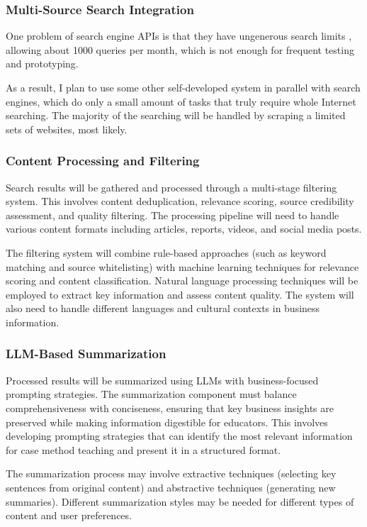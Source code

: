 \documentclass[project-plan]{report-template}
\begin{document}
\subsubsection{Multi-Source Search Integration} 
One problem of search engine APIs is that they have ungenerous search limits
\cite{search.api.limit.1}, allowing about 1000 queries per month, which is not
enough for frequent testing and prototyping.

As a result, I plan to use some other self-developed system in parallel with
search engines, which do only a small amount of tasks that truly require whole
Internet searching. The majority of the searching will be handled by scraping a
limited sets of websites, most likely.

\subsubsection{Content Processing and Filtering} Search results will be
gathered and processed through a multi-stage filtering system. This involves
content deduplication, relevance scoring, source credibility assessment, and
quality filtering. The processing pipeline will need to handle various content
formats including articles, reports, videos, and social media posts.

The filtering system will combine rule-based approaches (such as keyword
matching and source whitelisting) with machine learning techniques for
relevance scoring and content classification. Natural language processing
techniques will be employed to extract key information and assess content
quality. The system will also need to handle different languages and cultural
contexts in business information.

\subsubsection{LLM-Based Summarization} Processed results will be summarized
using LLMs with business-focused prompting strategies. The summarization
component must balance comprehensiveness with conciseness, ensuring that key
business insights are preserved while making information digestible for
educators. This involves developing prompting strategies that can identify the
most relevant information for case method teaching and present it in a
structured format.

The summarization process may involve extractive techniques (selecting key
sentences from original content) and abstractive techniques (generating new
summaries). Different summarization styles may be needed for different types of
content and user preferences.
\end{document}
